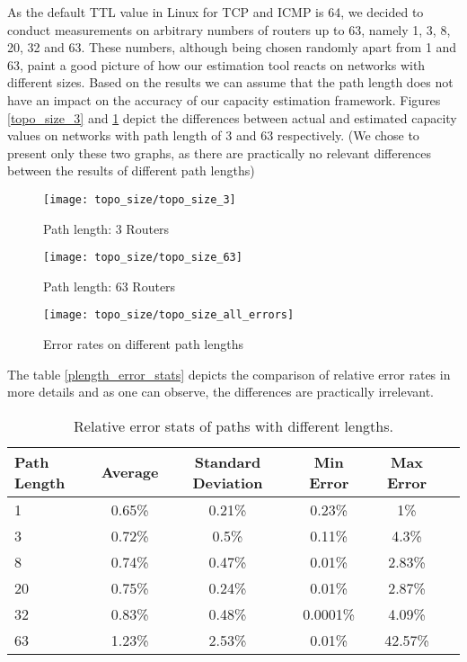 As the default TTL value in Linux for TCP and ICMP is 64\cite{ttl_hop_limit}, we decided to conduct measurements on arbitrary numbers of routers up to 63, namely 1, 3, 8, 20, 32 and 63. 
These numbers, although being chosen randomly apart from 1 and 63, paint a good picture of how our estimation tool reacts on networks with different sizes. Based on the results we can assume that the path length does not have an impact on the accuracy of our capacity estimation framework. Figures \ref{topo_size_3} and \ref{topo_size_63} depict the differences between actual and estimated capacity values on networks with path length of 3 and 63 respectively. (We chose to present only these two graphs, as there are practically no relevant differences between the results of different path lengths)

\begin{figure}[H]%
  \centering
  \begin{minipage}[b]{.45\textwidth}
    \texttt{[image: topo\_size/topo\_size\_3]}
    \caption{Path length: 3 Routers}
    \label{topo_size_3}
  \end{minipage}
  \hfill
  \begin{minipage}[b]{.45\textwidth}
    \texttt{[image: topo\_size/topo\_size\_63]}
    \caption{Path length: 63 Routers}
    \label{topo_size_63}
  \end{minipage}
\end{figure}

\begin{figure}[H]
 \centering
 \texttt{[image: topo\_size/topo\_size\_all\_errors]}
 \caption{Error rates on different path lengths}
 \label{topo_size_all_errors}
\end{figure}


The table \ref{plength_error_stats} depicts the comparison of relative error rates in more details and as one can observe, the differences are practically irrelevant. 


\begin{table}[h!]
  \centering
  \caption{Relative error stats of paths with different lengths.}
  \label{plength_error_stats}
\begin{tabular}{l|c|c|c|c|c}
\toprule
 Path Length & Average & Standard Deviation & Min Error & Max Error \\ \midrule
  \label{}
 1 	& 0.65\% & 0.21\% & 0.23\% & 1\% \\ 
 3 	& 0.72\% & 0.5\%  & 0.11\% & 4.3\% \\ 
 8 	& 0.74\% & 0.47\% & 0.01\% & 2.83\% \\
 20 & 0.75\% & 0.24\% & 0.01\% & 2.87\% \\
 32 & 0.83\% & 0.48\% & 0.0001\% & 4.09\% \\
 63 & 1.23\% & 2.53\% & 0.01\% & 42.57\% \\ \bottomrule
  \end{tabular}      
\end{table}



